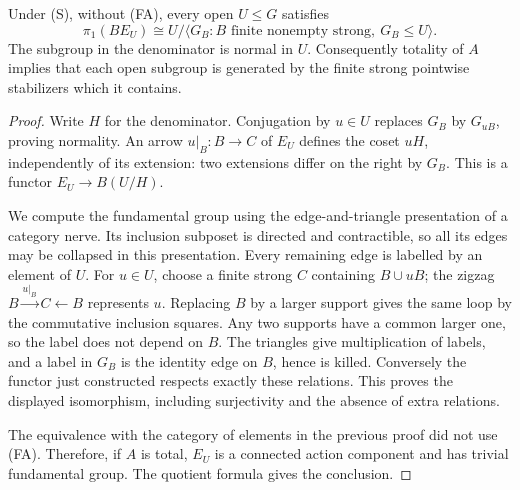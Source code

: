 \begin{proposition}
\label{B:fundamental}
Under (S), without (FA), every open $U\leq G$ satisfies
\[
 \pi_1(BE_U)\cong
 U\big/\langle G_B:B\text{ finite nonempty strong},\ G_B\leq U\rangle.
\]
The subgroup in the denominator is normal in $U$. Consequently
totality of $A$ implies that each open subgroup is generated by the
finite strong pointwise stabilizers which it contains.
\end{proposition}
\begin{proof}
Write $H$ for the denominator. Conjugation by $u\in U$ replaces
$G_B$ by $G_{uB}$, proving normality. An arrow $u|_B:B\to C$ of
$E_U$ defines the coset $uH$, independently of its extension: two
extensions differ on the right by $G_B$. This is a functor
$E_U\to B(U/H)$.

We compute the fundamental group using the edge-and-triangle
presentation of a category nerve. Its inclusion subposet is directed
and contractible, so all its edges may be collapsed in this
presentation. Every remaining edge is labelled by an element of
$U$. For $u\in U$, choose a finite strong $C$ containing
$B\cup uB$; the zigzag $B\xrightarrow{u|_B}C\leftarrow B$
represents $u$. Replacing $B$ by a larger support gives the same
loop by the commutative inclusion squares. Any two supports have a
common larger one, so the label does not depend on $B$. The triangles
give multiplication of labels, and a label in $G_B$ is the identity
edge on $B$, hence is killed. Conversely the functor just constructed
respects exactly these relations. This proves the displayed
isomorphism, including surjectivity and the absence of extra
relations.

The equivalence with the category of elements in the previous proof
did not use (FA). Therefore, if $A$ is total, $E_U$ is a connected
action component and has trivial fundamental group. The quotient
formula gives the conclusion.
\end{proof}

